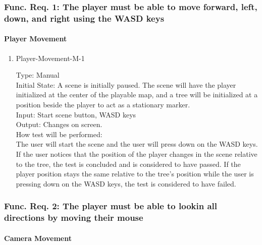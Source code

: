 \documentclass[12pt, titlepage]{article}
\begin{document}
\subsubsection{Func. Req. 1: The player must be able to move forward, left, down, and right using the WASD keys}
		
\paragraph{Player Movement}

\begin{enumerate}

\item{Player-Movement-M-1\\}

Type: Manual\\
					
Initial State: A scene is initially paused. The scene will have the player initialized at the center of the playable map, and a tree will be initialized at a position beside the player to act as a stationary marker.\\
					
Input: Start scene button, WASD keys \\
					
Output: Changes on screen. \\
					
How test will be performed:\\ The user will start the scene and the user will press down on the WASD keys. If the user notices that the position of the player changes in the scene relative to the tree, the test is concluded and is considered to have passed. If the player position stays the same relative to the tree's position while the user is pressing down on the WASD keys, the test is considered to have failed. \\

\end{enumerate}

\subsubsection{Func. Req. 2: The player must be able to lookin all directions by moving their mouse}
		
\paragraph{Camera Movement}
\end{document}
